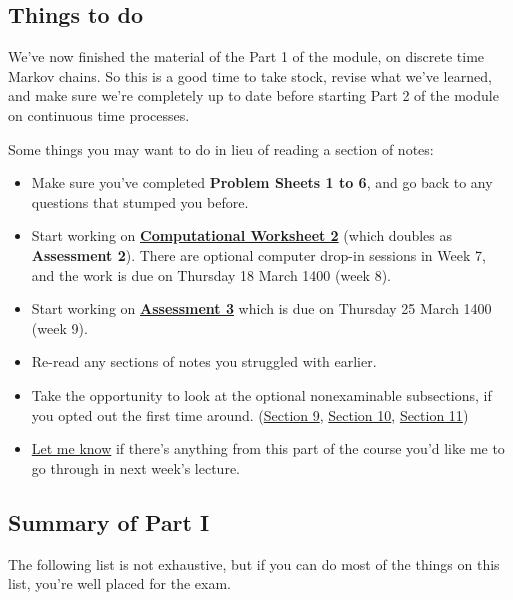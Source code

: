 \documentclass[
  a4paper,
]{article}
\providecommand{\tightlist}{%
  \setlength{\itemsep}{0pt}\setlength{\parskip}{0pt}}
\theoremstyle{definition}
\theoremstyle{definition}
\theoremstyle{definition}
\theoremstyle{remark}
\begin{document}
\hypertarget{todo-revision}{%
\subsection{Things to do}\label{todo-revision}}

We've now finished the material of the Part 1 of the module, on discrete time Markov chains. So this is a good time to take stock, revise what we've learned, and make sure we're completely up to date before starting Part 2 of the module on continuous time processes.

Some things you may want to do in lieu of reading a section of notes:

\begin{itemize}
\tightlist
\item
  Make sure you've completed \textbf{Problem Sheets 1 to 6}, and go back to any questions that stumped you before.
\item
  Start working on \textbf{\protect\hyperlink{computing}{Computational Worksheet 2}} (which doubles as \textbf{Assessment 2}). There are optional computer drop-in sessions in Week 7, and the work is due on Thursday 18 March 1400 (week 8).
\item
  Start working on \textbf{\protect\hyperlink{A3}{Assessment 3}} which is due on Thursday 25 March 1400 (week 9).
\item
  Re-read any sections of notes you struggled with earlier.
\item
  Take the opportunity to look at the optional nonexaminable subsections, if you opted out the first time around. (\protect\hyperlink{S09-strong-markov}{Section 9}, \protect\hyperlink{S10-proof}{Section 10}, \protect\hyperlink{S11-proofs}{Section 11})
\item
  \href{mailto:m.aldridge@leeds.ac.uk}{Let me know} if there's anything from this part of the course you'd like me to go through in next week's lecture.
\end{itemize}

\hypertarget{summary-i}{%
\subsection{Summary of Part I}\label{summary-i}}

The following list is not exhaustive, but if you can do most of the things on this list, you're well placed for the exam.
\end{document}
